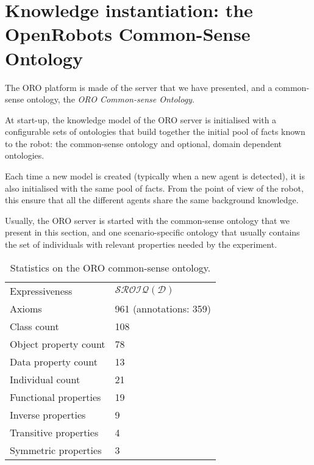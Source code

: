 
\section{Knowledge instantiation: the OpenRobots Common-Sense Ontology}

The ORO platform is made of the server that we have presented, and a
common-sense ontology, the \emph{ORO Common-sense Ontology}.

At start-up, the knowledge model of the ORO server is initialised with a
configurable sets of ontologies that build together the initial pool of facts
known to the robot: the common-sense ontology and optional, domain dependent
ontologies.

Each time a new model is created (typically when a new agent is detected), it
is also initialised with the same pool of facts.  From the point of view of the
robot, this ensure that all the different agents share the same background
knowledge.

Usually, the ORO server is started with the common-sense ontology that we
present in this section, and one scenario-specific ontology that usually
contains the set of individuals with relevant properties needed by the
experiment.

\begin{table}
\begin{center}

\begin{tabular}{ll}
\toprule
Expressiveness & $\mathcal{SROIQ(D)}$ \\
Axioms & 961 (annotations: 359)\\
Class count & 108 \\
Object property count & 78 \\
Data property count & 13 \\
Individual count & 21 \\
Functional properties & 19 \\
Inverse properties & 9 \\
Transitive properties & 4 \\
Symmetric properties & 3 \\
\bottomrule

\end{tabular}
\end{center}

\caption{Statistics on the ORO common-sense ontology.}

\label{table|onto-stats}
\end{table}

